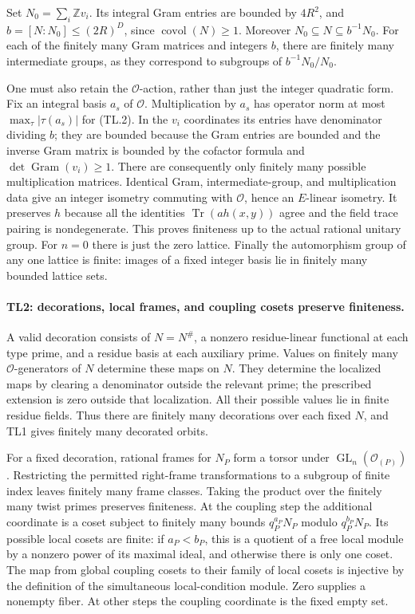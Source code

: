 \documentclass[11pt,a4paper]{article}
\numberwithin{equation}{section}
\theoremstyle{remark}\newtheorem{remark}[theorem]{Remark}
\begin{document}
Set $N_0=\sum_i\mathbb Z v_i$. Its integral Gram entries are bounded
by $4R^2$, and $b=[N:N_0]\le(2R)^D$, since
$\operatorname{covol}(N)\ge1$. Moreover
$N_0\subseteq N\subseteq b^{-1}N_0$. For each of the finitely many
Gram matrices and integers $b$, there are finitely many intermediate
groups, as they correspond to subgroups of
$b^{-1}N_0/N_0$.

One must also retain the $\mathcal O$-action, rather than just the
integer quadratic form. Fix an integral basis $a_s$ of $\mathcal O$.
Multiplication by $a_s$ has operator norm at most
$\max_\tau|\tau(a_s)|$ for (TL.2). In the $v_i$ coordinates its
entries have denominator dividing $b$; they are bounded because the
Gram entries are bounded and the inverse Gram matrix is bounded by
the cofactor formula and $\det\operatorname{Gram}(v_i)\ge1$.
There are consequently only finitely many possible multiplication
matrices. Identical Gram, intermediate-group, and multiplication data
give an integer isometry commuting with $\mathcal O$, hence an
$E$-linear isometry. It preserves $h$ because all the identities
$\operatorname{Tr}(a h(x,y))$ agree and the field trace pairing is
nondegenerate. This proves finiteness up to the actual rational
unitary group. For $n=0$ there is just the zero lattice.
Finally the automorphism group of any one lattice is finite: images
of a fixed integer basis lie in finitely many bounded lattice sets.

\paragraph{TL2: decorations, local frames, and coupling cosets preserve
finiteness.}
A valid decoration consists of $N=N^\#$, a nonzero residue-linear
functional at each type prime, and a residue basis at each auxiliary
prime. Values on finitely many $\mathcal O$-generators of $N$
determine these maps on $N$. They determine the localized maps by
clearing a denominator outside the relevant prime; the prescribed
extension is zero outside that localization. All their possible
values lie in finite residue fields. Thus there are finitely many
decorations over each fixed $N$, and TL1 gives finitely many decorated
orbits.

For a fixed decoration, rational frames for $N_P$ form a torsor under
$\operatorname{GL}_n(\mathcal O_{(P)})$. Restricting the permitted
right-frame transformations to a subgroup of finite index leaves
finitely many frame classes. Taking the product over the finitely
many twist primes preserves finiteness. At the coupling step the
additional coordinate is a coset subject to finitely many bounds
$q_P^{a_P}N_P$ modulo $q_P^{b_P}N_P$. Its possible local cosets are
finite: if $a_P<b_P$, this is a quotient of a free local module by
a nonzero power of its maximal ideal, and otherwise there is only
one coset. The map from global coupling cosets to their family of
local cosets is injective by the definition of the simultaneous
local-condition module. Zero supplies a nonempty fiber. At other
steps the coupling coordinate is the fixed empty set.
\end{document}
